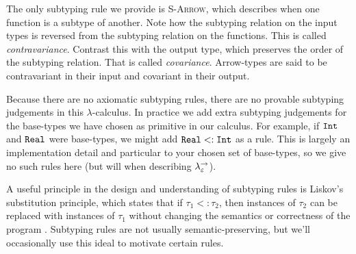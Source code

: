 The only subtyping rule we provide is \textsc{S-Arrow}, which describes when one function is a subtype of another. Note how the subtyping relation on the input types is reversed from the subtyping relation on the functions. This is called \textit{contravariance}. Contrast this with the output type, which preserves the order of the subtyping relation. That is called \textit{covariance}. Arrow-types are said to be contravariant in their input and covariant in their output.

Because there are no axiomatic subtyping rules, there are no provable subtyping judgements in this $\lambda$-calculus. In practice we add extra subtyping judgements for the base-types we have chosen as primitive in our calculus. For example, if $\mathtt{Int}$ and $\mathtt{Real}$ were base-types, we might add $\mathtt{Real} <: \mathtt{Int}$ as a rule. This is largely an implementation detail and particular to your chosen set of base-types, so we give no such rules here (but will when describing $\lambda^{\rightarrow}_{\varepsilon}$).

A useful principle in the design and understanding of subtyping rules is Liskov's substitution principle, which states that if $\tau_1 <: \tau_2$, then instances of $\tau_2$ can be replaced with instances of $\tau_1$ without changing the semantics or correctness of the program \cite{liskov87}. Subtyping rules are not usually semantic-preserving, but we'll occasionally use this ideal to motivate certain rules.


